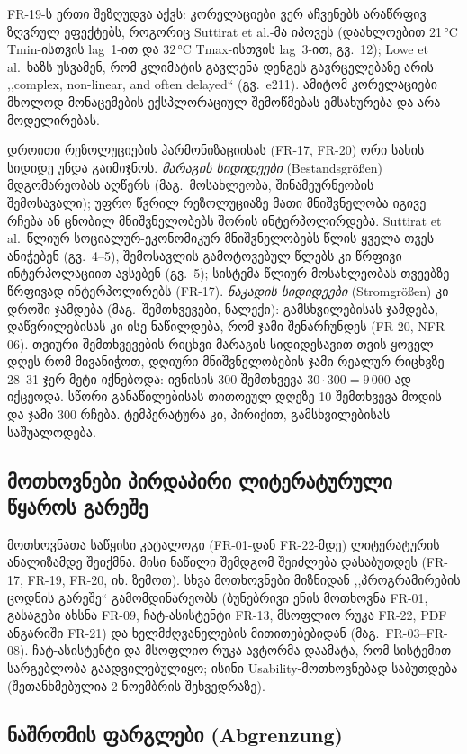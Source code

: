 \documentclass[11pt,a4paper]{article}
\newcommand{\enquote}[1]{,,#1``}
\begin{document}
\noindent FR-19-ს ერთი შეზღუდვა აქვს: კორელაციები ვერ აჩვენებს არაწრფივ
ზღვრულ ეფექტებს, როგორიც Suttirat et al.-მა იპოვეს (დაახლოებით 21\,°C Tmin-ისთვის
lag~1-ით და 32\,°C Tmax-ისთვის lag~3-ით, გვ.~12); Lowe et al.\ ხაზს უსვამენ, რომ
კლიმატის გავლენა დენგეს გავრცელებაზე არის \enquote{complex, non-linear, and often
delayed} (გვ.~e211). ამიტომ კორელაციები მხოლოდ მონაცემების ექსპლორაციულ
შემოწმებას ემსახურება და არა მოდელირებას.

\noindent დროითი რეზოლუციების ჰარმონიზაციისას (FR-17, FR-20) ორი სახის სიდიდე
უნდა გაიმიჯნოს. \emph{მარაგის სიდიდეები} (Bestandsgrößen) მდგომარეობას აღწერს
(მაგ.\ მოსახლეობა, შინამეურნეობის შემოსავალი); უფრო წვრილ რეზოლუციაზე მათი
მნიშვნელობა იგივე რჩება ან ცნობილ მნიშვნელობებს შორის ინტერპოლირდება. Suttirat
et al.\ წლიურ სოციალურ-ეკონომიკურ მნიშვნელობებს წლის ყველა თვეს ანიჭებენ
(გვ.~4--5), შემოსავლის გამოტოვებულ წლებს კი წრფივი ინტერპოლაციით ავსებენ
(გვ.~5); სისტემა წლიურ მოსახლეობას თვეებზე წრფივად ინტერპოლირებს (FR-17).
\emph{ნაკადის სიდიდეები} (Stromgrößen) კი დროში ჯამდება (მაგ.\ შემთხვევები,
ნალექი): გამსხვილებისას ჯამდება, დაწვრილებისას კი ისე ნაწილდება, რომ ჯამი
შენარჩუნდეს (FR-20, NFR-06). თვიური შემთხვევების რიცხვი მარაგის სიდიდესავით
თვის ყოველ დღეს რომ მივანიჭოთ, დღიური მნიშვნელობების ჯამი რეალურ რიცხვზე
28--31-ჯერ მეტი იქნებოდა: ივნისის 300 შემთხვევა $30 \cdot 300 = 9\,000$-ად
იქცეოდა. სწორი განაწილებისას თითოეულ დღეზე 10 შემთხვევა მოდის და ჯამი 300 რჩება.
ტემპერატურა კი, პირიქით, გამსხვილებისას საშუალოდება.

\subsection{მოთხოვნები პირდაპირი ლიტერატურული წყაროს გარეშე}

მოთხოვნათა საწყისი კატალოგი (FR-01-დან FR-22-მდე) ლიტერატურის ანალიზამდე
შეიქმნა. მისი ნაწილი შემდგომ შეიძლება დასაბუთდეს (FR-17, FR-19, FR-20, იხ.
ზემოთ). სხვა მოთხოვნები მიზნიდან \enquote{პროგრამირების ცოდნის გარეშე}
გამომდინარეობს (ბუნებრივი ენის მოთხოვნა FR-01, გასაგები ახსნა FR-09,
ჩატ-ასისტენტი FR-13, მსოფლიო რუკა FR-22, PDF ანგარიში FR-21) და ხელმძღვანელების
მითითებებიდან (მაგ.\ FR-03--FR-08).
ჩატ-ასისტენტი და მსოფლიო რუკა ავტორმა დაამატა, რომ სისტემით სარგებლობა
გაადვილებულიყო; ისინი Usability-მოთხოვნებად საბუთდება (შეთანხმებულია
2 ნოემბრის შეხვედრაზე).

\subsection{ნაშრომის ფარგლები (Abgrenzung)}
\end{document}
